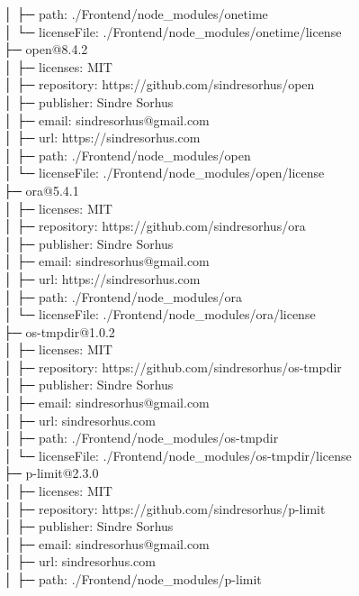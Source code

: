 │  ├─ path: ./Frontend/node\_modules/onetime\\
│  └─ licenseFile: ./Frontend/node\_modules/onetime/license\\
├─ open@8.4.2\\
│  ├─ licenses: MIT\\
│  ├─ repository: https://github.com/sindresorhus/open\\
│  ├─ publisher: Sindre Sorhus\\
│  ├─ email: sindresorhus@gmail.com\\
│  ├─ url: https://sindresorhus.com\\
│  ├─ path: ./Frontend/node\_modules/open\\
│  └─ licenseFile: ./Frontend/node\_modules/open/license\\
├─ ora@5.4.1\\
│  ├─ licenses: MIT\\
│  ├─ repository: https://github.com/sindresorhus/ora\\
│  ├─ publisher: Sindre Sorhus\\
│  ├─ email: sindresorhus@gmail.com\\
│  ├─ url: https://sindresorhus.com\\
│  ├─ path: ./Frontend/node\_modules/ora\\
│  └─ licenseFile: ./Frontend/node\_modules/ora/license\\
├─ os-tmpdir@1.0.2\\
│  ├─ licenses: MIT\\
│  ├─ repository: https://github.com/sindresorhus/os-tmpdir\\
│  ├─ publisher: Sindre Sorhus\\
│  ├─ email: sindresorhus@gmail.com\\
│  ├─ url: sindresorhus.com\\
│  ├─ path: ./Frontend/node\_modules/os-tmpdir\\
│  └─ licenseFile: ./Frontend/node\_modules/os-tmpdir/license\\
├─ p-limit@2.3.0\\
│  ├─ licenses: MIT\\
│  ├─ repository: https://github.com/sindresorhus/p-limit\\
│  ├─ publisher: Sindre Sorhus\\
│  ├─ email: sindresorhus@gmail.com\\
│  ├─ url: sindresorhus.com\\
│  ├─ path: ./Frontend/node\_modules/p-limit\\

